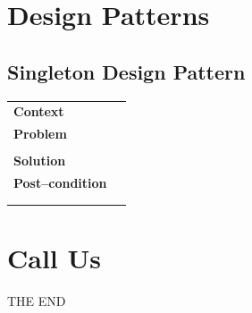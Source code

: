\documentclass{article}
\begin{document}
\newpage


\section{Design Patterns}

\subsection{Singleton Design Pattern}
    \begin{tabular}{ l | l }
    \toprule
      \rowcolor{LightCyan}
      \textbf{Context}            & \textit{}\\
      \textbf{Problem}            & \textit{}\\
                                  & \textit{}\\
      \rowcolor{LightCyan}
      \textbf{Solution}           & \textit{}\\
      \textbf{Post--condition}    & \textit{}\\
                                  & \textit{}\\
                                  & \textit{}\\
    \toprule
    \end{tabular}

\begin{figure}[ht!]
\centering
\end{figure}






\section{Call Us}
THE END
\end{document}
